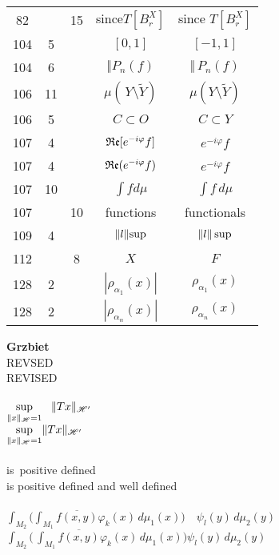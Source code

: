 \documentclass[a4paper,11pt]{article}
\numberwithin{equation}{section}
\begin{document}
\begin{center}
\begin{tabular}{|c|c|c|c|c|}
    82  & & 15 & since$T[ B_{ r }^{ X } ]$ & since $T[ B_{ r }^{ X } ]$ \\
    104 &  5 & & $[ 0, 1 ]$ & $[ -1, 1 ]$ \\
    104 &  6 & & $\Vert P_{ n }( f )$ & $\Vert \, P_{ n }( f )$ \\
    106 & 11 & & $\mu( \, Y \setminus \widetilde{ Y } )$
           & $\mu( Y \setminus \widetilde{ Y } )$ \\
    106 &  5 & & $C \subset O$ & $C \subset Y$ \\
    107 &  4 & & $\operatorname{\mathfrak{Re}}[ e^{ -i \varphi } f ]$ & $e^{ -i \varphi } f$ \\
    107 &  4 & & $\operatorname{\mathfrak{Re}}( e^{ -i \varphi } f )$ & $e^{ -i \varphi } f$ \\
    107 & 10 & & $\int\! fd\mu$ & $\int f \, d\mu$ \\
    107 & & 10 & functions & functionals \\
    109 & 4 & & $\lVert{  l  }\rVert\!\sup$ & $\lVert{  l  }\rVert \sup$ \\
    112 & & 8 & $X$ & $F$ \\
    128 & 2 & & $| \rho_{ \alpha_{ 1 } }( x ) |$ & $\rho_{ \alpha_{ 1 } }( x )$ \\
    128 & 2 & & $| \rho_{ \alpha_{ n } }( x ) |$ & $\rho_{ \alpha_{ n } }( x )$ \\
    \hline
  \end{tabular}

\end{center}


\noindent
\textbf{Grzbiet} \\
\Jest  REVSED \\
\Powin REVISED \\
 \\
\Jest
$\displaystyle \sup_{ \substack{ \lVert{  x  }\rVert_{ \mathcal{H} } = 1 } } \;\;\;
\lVert{  T x  }\rVert_{ \mathcal{H}' }$ \\[0.4em]
\Powin
$\displaystyle \sup_{ \substack{ \lVert{  x  }\rVert_{ \mathcal{H} } = 1 } }
\lVert{  T x  }\rVert_{ \mathcal{H}' }$ \\[0.4em]
 \\
\Jest  is~positive defined \\
\Powin is positive defined and well defined \\
 \\
\Jest
$\displaystyle \int_{ M_{ 2 } } \bigg( \int_{ M_{ 1 } }
\overline{ f( x, y ) } \varphi_{ k }( x ) \,
d\mu_{ 1 }( x ) \bigg) \quad \psi_{ l }( y ) \, d\mu_{ 2 }( y )$ \\
\Powin
$\displaystyle \int_{ M_{ 2 } } \bigg( \, \int_{ M_{ 1 } }
\overline{ f( x, y ) } \varphi_{ k }( x ) \, d\mu_{ 1 }( x ) \bigg)
\psi_{ l }( y ) \, d\mu_{ 2 }( y )$
\end{document}
